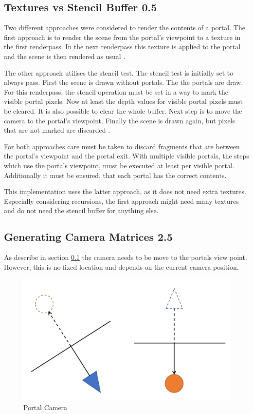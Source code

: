 \subsection{Textures vs Stencil Buffer 0.5}
\label{section:textursVsStencil}
Two different approaches were considered to render the contents of a portal. The first approach is to render the scene from the portal's viewpoint to a texture in the first renderpass. In the next renderpass this texture is applied to the portal and the scene is then rendered as usual \cite{lecture:portalProblems}.  %

The other approach utilises the stencil test. The stencil test is initially set to always pass. First the scene is drawn without portals.
The the portals are draw. For this renderpass, the stencil operation must be set in a way to mark the visible portal pixels. Now at least the depth values for visible portal pixels must be cleared. It is also possible to clear the whole buffer. Next step is to move the camera to the portal's viewpoint. Finally the scene is drawn again, but pixels that are not marked are discarded \cites{schmalstieg:1999:sewing, lowe:2005:technique, lecture:portalProblems}.

For both approaches care must be taken to discard fragments that are between the portal's viewpoint and the portal exit. With multiple visible portals, the steps which use the portals viewpoint, must be executed at least per visible portal. Additionally it must be ensured, that each portal has the correct contents.

This implementation uses the latter approach, as it does not need extra textures. Especially considering recursions, the first approach might need many textures and do not need the stencil buffer for anything else.

\subsection{Generating Camera Matrices 2.5}
As describe in section \ref{section:textursVsStencil} the camera needs to be move to the portals view point. However, this is no fixed location and depends on the current camera position.

\begin{figure}[h]
	\includegraphics[width=\linewidth]{images/camera_matrices.png}
	\caption{Portal Camera}
	\label{fig:cameramatrices}
\end{figure}

